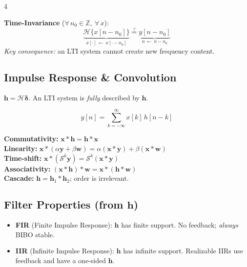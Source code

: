 \documentclass[8pt,a4paper,landscape]{extarticle}
\begin{document}
\begin{multicols*}{4}
\begin{defn}[title=Linearity \& time-invariance]
\textbf{Time-Invariance} ($\forall\, n_0 \in \mathbb{Z},\ \forall\, x$):
\[
    \underbrace{\mathcal{H}\{x[n - n_0]\}}_{x[\cdot] \,\leftarrow\, x[\cdot - n_0]} \stackrel{?}{=} \underbrace{y[n - n_0]}_{n \,\leftarrow\, n - n_0}
\]
\emph{Key consequence:} an LTI system cannot create new frequency content.

\end{defn}

\subsection{Impulse Response \& Convolution}

\begin{thm}[title=Impulse response]
$\mathbf{h}=\mathcal{H}\boldsymbol{\delta}$. An LTI system is \emph{fully} described by $\mathbf{h}$.
\end{thm}

\begin{defn}[title={Convolution $\mathbf{y}=\mathbf{x}*\mathbf{h}$}]
\[y[n]=\sum_{k=-\infty}^{\infty}x[k]\,h[n-k]\]
\end{defn}

\begin{prop}[title=Convolution properties]
\textbf{Commutativity:} $\mathbf{x}*\mathbf{h}=\mathbf{h}*\mathbf{x}$\\
\textbf{Linearity:} $\mathbf{x}*(\alpha\mathbf{y}+\beta\mathbf{w})=\alpha(\mathbf{x}*\mathbf{y})+\beta(\mathbf{x}*\mathbf{w})$\\
\textbf{Time-shift:} $\mathbf{x}*(\mathcal{S}^k\mathbf{y})=\mathcal{S}^k(\mathbf{x}*\mathbf{y})$\\
\textbf{Associativity:} $(\mathbf{x}*\mathbf{h})*\mathbf{w}=\mathbf{x}*(\mathbf{h}*\mathbf{w})$\\
\textbf{Cascade:} $\mathbf{h}=\mathbf{h}_1*\mathbf{h}_2$; order is irrelevant.
\end{prop}

\subsection{\texorpdfstring{Filter Properties (from $\mathbf{h}$)}{Filter Properties (from h)}}

\begin{defn}[title=FIR vs IIR]
\begin{itemize}
  \item \textbf{FIR} (Finite Impulse Response): $\mathbf{h}$ has finite support. No feedback; \emph{always} BIBO stable.
  \item \textbf{IIR} (Infinite Impulse Response): $\mathbf{h}$ has infinite support. Realizable IIRs use feedback and have a one-sided $\mathbf{h}$.
\end{itemize}
\end{defn}


\end{multicols*}
\end{document}
